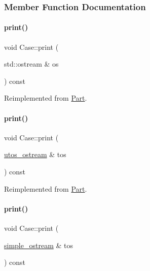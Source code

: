 \subsubsection{Member Function Documentation}
\mbox{\label{class_case_a9e54f42dcb7b62f1792a6475ce60aa79}} 
\paragraph{\texorpdfstring{print()}{print()}\hspace{0.1cm}{\footnotesize\ttfamily [1/4]}}
{\footnotesize\ttfamily void Case\+::print (\begin{DoxyParamCaption}\item[{std\+::ostream \&}]{os }\end{DoxyParamCaption}) const\hspace{0.3cm}{\ttfamily [virtual]}}



Reimplemented from \mbox{\hyperlink{class_part_a4fa402b8e8fd4236ff773a7697ab2bc3}{Part}}.

\mbox{\label{class_case_ae179519844b825815f4accddafae13b6}} 
\paragraph{\texorpdfstring{print()}{print()}\hspace{0.1cm}{\footnotesize\ttfamily [2/4]}}
{\footnotesize\ttfamily void Case\+::print (\begin{DoxyParamCaption}\item[{\mbox{\hyperlink{structutos__ostream}{utos\+\_\+ostream}} \&}]{tos }\end{DoxyParamCaption}) const\hspace{0.3cm}{\ttfamily [virtual]}}



Reimplemented from \mbox{\hyperlink{class_part_a9ecabe44ba3415badf82c6a23617a41e}{Part}}.

\mbox{\label{class_case_a580b6870ea256cab7e7eee36820803e7}} 
\paragraph{\texorpdfstring{print()}{print()}\hspace{0.1cm}{\footnotesize\ttfamily [3/4]}}
{\footnotesize\ttfamily void Case\+::print (\begin{DoxyParamCaption}\item[{\mbox{\hyperlink{structsimple__ostream}{simple\+\_\+ostream}} \&}]{tos }\end{DoxyParamCaption}) const\hspace{0.3cm}{\ttfamily [virtual]}}



